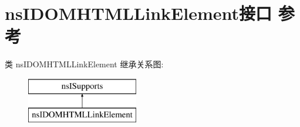 \hypertarget{interfacens_i_d_o_m_h_t_m_l_link_element}{}\section{ns\+I\+D\+O\+M\+H\+T\+M\+L\+Link\+Element接口 参考}
\label{interfacens_i_d_o_m_h_t_m_l_link_element}
类 ns\+I\+D\+O\+M\+H\+T\+M\+L\+Link\+Element 继承关系图\+:\begin{figure}[H]
\begin{center}
\leavevmode
\includegraphics[height=2.000000cm]{interfacens_i_d_o_m_h_t_m_l_link_element}
\end{center}
\end{figure}
